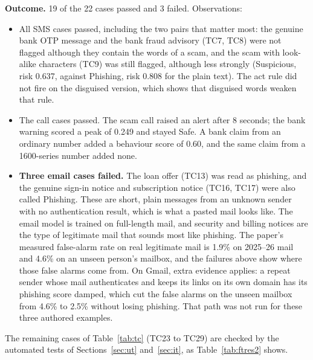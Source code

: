 {\textbf{Outcome.} 19 of the 22 cases passed and 3 failed. Observations:
\begin{itemize}
\item All SMS cases passed, including the two pairs that matter most: the genuine bank OTP message and the bank fraud advisory (TC7, TC8) were not flagged although they contain the words of a scam, and the scam with look-alike characters (TC9) was still flagged, although less strongly (Suspicious, risk 0.637, against Phishing, risk 0.808 for the plain text). The act rule did not fire on the disguised version, which shows that disguised words weaken that rule.
\item The call cases passed. The scam call raised an alert after 8 seconds; the bank warning scored a peak of 0.249 and stayed Safe. A bank claim from an ordinary number added a behaviour score of 0.60, and the same claim from a 1600-series number added none.
\item \textbf{Three email cases failed.} The loan offer (TC13) was read as phishing, and the genuine sign-in notice and subscription notice (TC16, TC17) were also called Phishing. These are short, plain messages from an unknown sender with no authentication result, which is what a pasted mail looks like. The email model is trained on full-length mail, and security and billing notices are the type of legitimate mail that sounds most like phishing. The paper's measured false-alarm rate on real legitimate mail is 1.9\% on 2025--26 mail and 4.6\% on an unseen person's mailbox, and the failures above show where those false alarms come from. On Gmail, extra evidence applies: a repeat sender whose mail authenticates and keeps its links on its own domain has its phishing score damped, which cut the false alarms on the unseen mailbox from 4.6\% to 2.5\% without losing phishing. That path was not run for these three authored examples.
\end{itemize}

The remaining cases of Table~\ref{tab:tc} (TC23 to TC29) are checked by the automated tests of Sections~\ref{sec:ut} and~\ref{sec:it}, as Table~\ref{tab:ftres2} shows.

}
